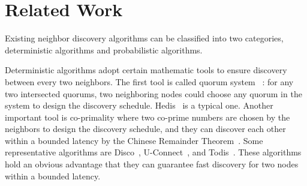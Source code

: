 \section{Related Work}
\label{RW}








Existing neighbor discovery algorithms can be classified into two categories, deterministic algorithms and probabilistic algorithms.

Deterministic algorithms adopt certain mathematic tools to ensure discovery between every two neighbors. The first tool is called quorum system~\cite{jiang2005quorum,luk1997two} : for any two intersected quorums, two neighboring nodes could choose any quorum in the system to design the discovery schedule. Hedis~\cite{chen2015heterogeneous} is a typical one. Another important tool is co-primality where two co-prime numbers are chosen by the neighbors to design the discovery schedule, and they can discover each other within a bounded latency by the Chinese Remainder Theorem~\cite{ding1996chinese}. Some representative algorithms are Disco~\cite{dutta2008practical}, U-Connect~\cite{kandhalu2010u}, and Todis~\cite{chen2015heterogeneous}. These algorithms hold an obvious advantage that they can guarantee fast discovery for two nodes within a bounded latency. 

